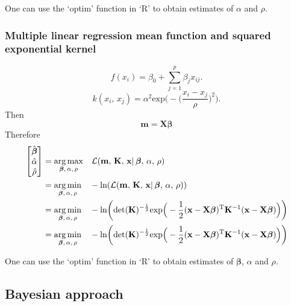          One can use the `optim' function in `R' to obtain estimates of \(\alpha\) and \(\rho\).
      
      \subsubsection{Multiple linear regression mean function and squared exponential kernel}

         \[f(x_{i}) = \beta_{0} + \sum_{j=1}^{p} \beta_{j} x_{ij}.\]
         \[k(x_{i},\, x_{j}) = \alpha^{2} \text{exp} \bigg(- \Big(\frac{x_i - x_j}{\rho} \Big)^2 \bigg).\]
         Then \[\mathbf{m} = \mathbf{X}\boldsymbol{\beta}\]
         Therefore
         \begin{align*}
            \begin{bmatrix} \hat{\boldsymbol{\beta}} \\ \hat{\alpha} \\ \hat{\rho} \end{bmatrix}
            & = \underset{\boldsymbol{\beta} ,\, \alpha ,\, \rho}{\arg\max} \quad \mathcal{L}(\mathbf{m} ,\, \mathbf{K} ,\, \mathbf{x}| \, \boldsymbol{\beta} ,\, \alpha ,\, \rho)\\
            & = \underset{\boldsymbol{\beta} ,\, \alpha ,\, \rho}{\arg\min} \quad -\text{ln}(\mathcal{L}(\mathbf{m} ,\, \mathbf{K} ,\, \mathbf{x}| \, \boldsymbol{\beta} ,\, \alpha ,\, \rho))\\
            & = \underset{\boldsymbol{\beta} ,\, \alpha ,\, \rho}{\arg\min} \quad -\text{ln} \bigg(\text{det}(\mathbf{K})^{-\frac{1}{2}} 
            \text{exp} \Big(-\frac{1}{2} (\mathbf{x} - \mathbf{X}\boldsymbol{\beta})^{\text{\text{T}}} \mathbf{K}^{-1} (\mathbf{x} - \mathbf{X}\boldsymbol{\beta}) \Big) \bigg)\\
            & = \underset{\boldsymbol{\beta} ,\, \alpha ,\, \rho}{\arg\min} \quad -\text{ln} \bigg(\text{det}(\mathbf{K})^{-\frac{1}{2}} 
            \text{exp} \Big(-\frac{1}{2} (\mathbf{x} - \mathbf{X}\boldsymbol{\beta})^{\text{\text{T}}} \mathbf{K}^{-1} (\mathbf{x} - \mathbf{X}\boldsymbol{\beta}) \Big) \bigg)
         \end{align*}

         One can use the `optim' function in `R' to obtain estimates of \(\boldsymbol{\beta}\), \(\alpha\) and \(\rho\).
   
   \subsection{Bayesian approach}

